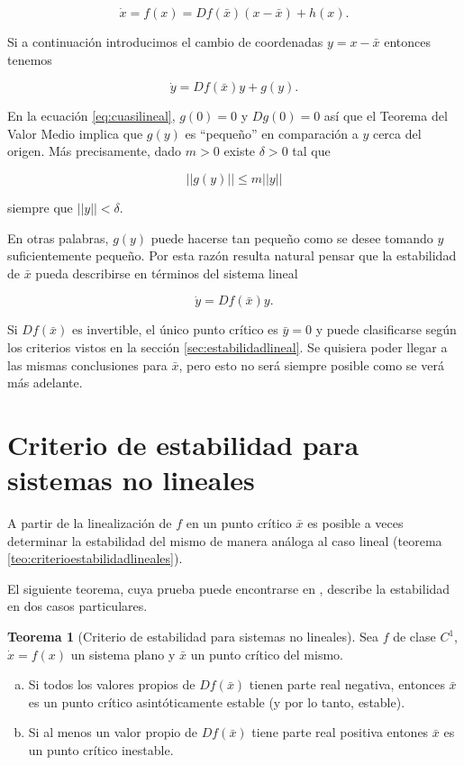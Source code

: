 \documentclass[11pt]{book}
\theoremstyle{definition}
\numberwithin{definition}{section}
\theoremstyle{theorem}
\newtheorem{theorem}{Teorema}
\numberwithin{theorem}{section}
\numberwithin{lemma}{section}
\numberwithin{corollary}{section}
\theoremstyle{plain}
\numberwithin{example}{section}
\begin{document}
$$ \dot{x} = f(x) = Df(\bar{x})(x - \bar{x}) + h(x).$$

Si a continuación introducimos el cambio de coordenadas $y = x - \bar{x}$ entonces tenemos 

\begin{equation} \label{eq:cuasilineal}
	\dot{y} = Df(\bar{x})y + g(y).
\end{equation}

En la ecuación \ref{eq:cuasilineal}, $g(0) = 0$ y $Dg(0) = 0$ así que el Teorema del Valor Medio implica que $g(y)$ es ``pequeño'' en comparación a $y$ cerca del origen. Más precisamente, dado $m > 0$ existe $\delta > 0$ tal que 

$$ ||g(y)|| \leq m||y||$$

siempre que $||y|| < \delta$.

En otras palabras, $g(y)$ puede hacerse tan pequeño como se desee tomando $y$ suficientemente pequeño. Por esta razón resulta natural pensar que la estabilidad de $\bar{x}$ pueda describirse en términos del sistema lineal

\begin{equation} \label{eq:linealizacion}
	\dot{y} = Df(\bar{x})y.
\end{equation}

Si $Df(\bar{x})$ es invertible, el único punto crítico es $\bar{y} = 0$ y puede clasificarse según los criterios vistos en la sección \ref{sec:estabilidadlineal}.
Se quisiera poder llegar a las mismas conclusiones para $\bar{x}$, pero esto no será siempre posible como se verá más adelante.

\section{Criterio de estabilidad para sistemas no lineales}
A partir de la linealización de $f$ en un punto crítico $\bar{x}$ es posible a veces determinar la estabilidad del mismo de manera análoga al caso lineal (teorema \ref{teo:criterioestabilidadlineales}).

El siguiente teorema, cuya prueba puede encontrarse en \cite[p.~267,272]{dynandbif}, describe la estabilidad en dos casos particulares.

\begin{theorem}[Criterio de estabilidad para sistemas no lineales] \label{teo:criterioestabilidadnolineales}
Sea $f$ de clase $C^1$, $\dot{x} = f(x)$ un sistema plano y $\bar{x}$ un punto crítico del mismo.

\begin{enumerate}[(a)]
	\item Si todos los valores propios de $Df(\bar{x})$ tienen parte real negativa, entonces $\bar{x}$ es un punto crítico asintóticamente estable (y por lo tanto, estable).
	\item Si al menos un valor propio de $Df(\bar{x})$ tiene parte real positiva entones $\bar{x}$ es un punto crítico inestable.
\end{enumerate}
\end{theorem}
\end{document}
